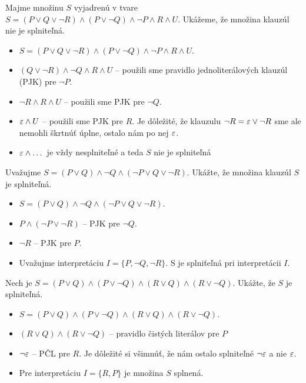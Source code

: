 \begin{priklad}
    Majme množinu $S$ vyjadrenú v tvare
    $S=(P \lor Q \lor \neg R) \land (P \lor \neg Q) 
        \land \neg P \land R \land U$.
    Ukážeme, že množina klauzúl nie je splniteľná.

    \begin{itemize}
    \item $S=(P \lor Q \lor \neg R) \land (P \lor \neg Q) 
            \land \neg P \land R \land U$.

    \item $(Q \lor \neg R) \land  \neg Q \land R \land U$ -- použili
        sme pravidlo jednoliterálových klauzúl (PJK) pre $\neg P$.

    \item $\neg R \land R \land U$ -- použili
        sme PJK pre $\neg Q$.

    \item $\varepsilon \land U$ -- použili
        sme PJK pre $R$. Je dôležité,
        že klauzulu $\neg R = \varepsilon \lor \neg R$ 
        sme ale nemohli škrtnúť úplne, ostalo nám po nej $\varepsilon$.

    \item $\varepsilon \land \dots$ je vždy nesplniteľné a teda $S$ nie je
        splniteľná
    \end{itemize}
\end{priklad}

\begin{priklad}
    Uvažujme $S=(P \lor Q) \land \neg Q \land ( \neg P \lor Q \lor \neg R)$.
    Ukážte, že množina klauzúl $S$ je splniteľná.

    \begin{itemize}
    \item $S=(P \lor Q) \land \neg Q \land ( \neg P \lor Q \lor \neg R)$.
    \item $P \land (\neg P \lor \neg R)$ -- PJK pre $\neg Q$.
    \item $\neg R$ -- PJK pre $P$.
    \item Uvažujme interpretáciu $I=\{P,\neg Q,\neg R\}$. S je
        splniťeľná pri interpretácii $I$.
    \end{itemize}
\end{priklad}

\begin{priklad}
    Nech je $S=(P \lor Q) \land (P \lor \neg Q) \land
        (R \lor Q) \land (R \lor \neg Q)$.
    Ukážte, že $S$ je splniteľná.

    \begin{itemize}
    \item $S=(P \lor Q) \land (P \lor \neg Q) \land
            (R \lor Q) \land (R \lor \neg Q)$.
    
    \item $(R \lor Q) \land (R \lor \neg Q)$ -- pravidlo čistých
    literálov pre $P$

    \item $\neg \varepsilon$ -- PČL pre $R$. Je dôležité si všimnúť, že nám
        ostalo splniteľné $\neg \varepsilon$ a nie $\varepsilon$.
    \item Pre interpretáciu $I=\{R,P\}$ je množina $S$ splnená.
    \end{itemize}
\end{priklad}

